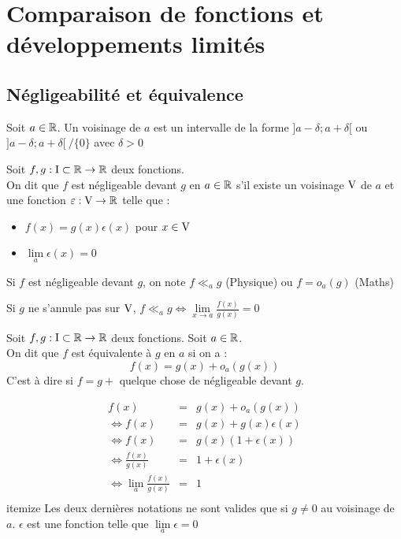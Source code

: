 \chapter{Comparaison de fonctions et développements limités}
\section{Négligeabilité  et équivalence}

\begin{defi}
Soit $a\in\mathbb{R}$. Un voisinage de $a$ est un intervalle de la forme $]a-\delta;a+\delta[$ ou $]a-\delta;a+\delta[~/\{0\}$ avec $\delta>0$
\end{defi}

\begin{defi}[Négligeabilité]
Soit $f,g:\text{I}\subset\mathbb{R} \to \mathbb{R}$ deux fonctions.\\
On dit que $f$ est négligeable devant $g$ en $a\in\mathbb{R}$ s'il existe un voisinage $\text{V}$ de $a$ et une fonction $\varepsilon:\text{V}\to\mathbb{R}$ telle que :
\begin{itemize}
	\item $f(x) = g(x)\epsilon (x)$ pour $x\in \text{V}$
	\item $\lim\limits_{a}\epsilon(x)=0$
\end{itemize}
\end{defi}

\begin{nota}
Si $f$ est négligeable devant $g$, on note $f \ll_{a}g$ (Physique) ou $f=o_a(g)$ (Maths)
\end{nota}
\begin{rem}
Si $g$ ne s'annule pas sur $\text{V}$, $f \ll_a g \Leftrightarrow \lim\limits_{x\to a}\frac{f(x)}{g(x)}=0$
\end{rem}
\begin{expl}
\end{expl}

\begin{defi}[Équivalence]
Soit $f,g:\text{I}\subset\mathbb{R} \to \mathbb{R}$ deux fonctions. Soit $a\in\mathbb{R}$.\\
On dit que $f$ est équivalente à $g$ en $a$ si on a :
$$f(x) = g(x) + o_a(g(x))$$
C'est à dire si $f=g+$ quelque chose de négligeable devant $g$.
\end{defi}
\begin{rem}
\begin{eqnarray*}
		f(x) &=& g(x) + o_a(g(x))\\
		\Leftrightarrow f(x) & = & g(x) + g(x)\epsilon(x)\\
		\Leftrightarrow f(x) & = & g(x)(1+\epsilon(x))\\
		\Leftrightarrow \frac{f(x)}{g(x)} &=& 1 + \epsilon(x)\\
		\Leftrightarrow \lim\limits_a\frac{f(x)}{g(x)} &=& 1\\
\end{eqnarray*}itemize
Les deux dernières notations ne sont valides que si $g\neq 0$ au voisinage de $a$. $\epsilon$ est une fonction telle que $\lim\limits_a\epsilon=0$ 
\end{rem}


